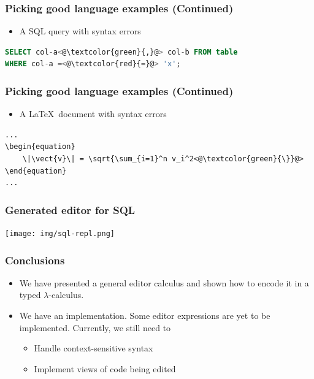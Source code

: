 \documentclass[t,24pt,serif,aspectratio=169]{beamer}
\begin{document}
\begin{frame}[fragile]
    \frametitle{Picking good language examples (Continued)}

    \begin{multicols}{2}
        \begin{itemize}
            \item A SQL query with syntax errors

        \end{itemize}

        \columnbreak

        \begin{lstlisting}[language=sql]
SELECT col-a<@\textcolor{green}{,}@> col-b FROM table
WHERE col-a =<@\textcolor{red}{=}@> 'x';
        \end{lstlisting}
    \end{multicols}
\end{frame}

\begin{frame}[fragile]
    \frametitle{Picking good language examples (Continued)}

    \begin{multicols*}{2}
        \begin{itemize}
            \item A \LaTeX \ document with syntax errors
        \end{itemize}

        \columnbreak

        \begin{lstlisting}[basicstyle=\tiny\ttfamily]
...
\begin{equation}
    \|\vect{v}\| = \sqrt{\sum_{i=1}^n v_i^2<@\textcolor{green}{\}}@>
\end{equation}
...
        \end{lstlisting}
    \end{multicols*}
\end{frame}

\begin{frame}[hvid]
    \frametitle{Generated editor for SQL}
    \texttt{[image: img/sql-repl.png]}
\end{frame}


\begin{frame}[hvid]
    \frametitle{Conclusions}
    \begin{itemize}
      
    \item We have presented a general editor calculus and shown how to
      encode it in a typed $\lambda$-calculus.
        \item We have an implementation. Some editor expressions
          are yet to be implemented. Currently, we still need to
              \begin{itemize}
                  \item Handle context-sensitive syntax
                  \item Implement views of code being edited
              \end{itemize}
    \end{itemize}
\end{frame}
\end{document}
